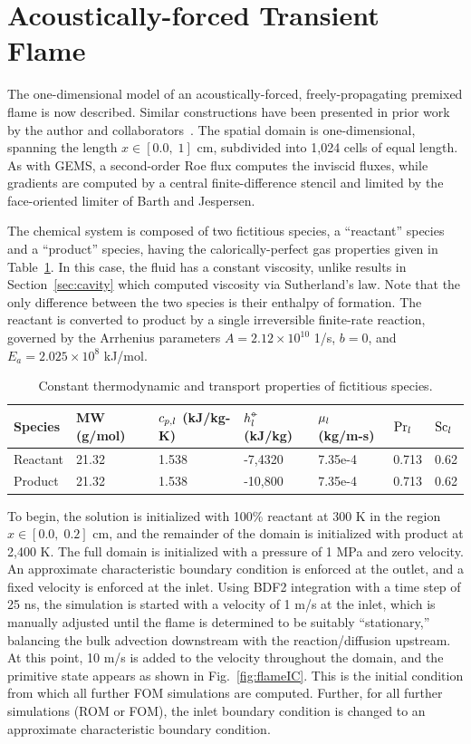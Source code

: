 \section{Acoustically-forced Transient Flame}\label{sec:oneDFlame}

The one-dimensional model of an acoustically-forced, freely-propagating premixed flame is now described. Similar constructions have been presented in prior work by the author and collaborators~\cite{Huang2022,Wentland2019}. The spatial domain is one-dimensional, spanning the length $x \in [0.0, \; 1]$ cm, subdivided into 1,024 cells of equal length. As with GEMS, a second-order Roe flux computes the inviscid fluxes, while gradients are computed by a central finite-difference stencil and limited by the face-oriented limiter of Barth and Jespersen.

The chemical system is composed of two fictitious species, a ``reactant'' species and a ``product'' species, having the calorically-perfect gas properties given in Table~\ref{tab:oneDFlameSpecs}. In this case, the fluid has a constant viscosity, unlike results in Section~\ref{sec:cavity} which computed viscosity via Sutherland's law. Note that the only difference between the two species is their enthalpy of formation. The reactant is converted to product by a single irreversible finite-rate reaction, governed by the Arrhenius parameters $A = 2.12 \times 10^{10}$ 1/s, $b = 0$, and $E_a = 2.025 \times 10^{8}$ kJ/mol.

\begin{table}
	\centering
	\begin{tabular}{ lllllll }
	\toprule
	Species & MW (g/mol) & $c_{p,l}$ (kJ/kg-K) & $h^{\circ\kern-0.47em-}_{l}$ (kJ/kg) & $\mu_{l}$ (kg/m-s) & $\text{Pr}_{l}$ & $\text{Sc}_{l}$   \\
	\midrule
	Reactant & 21.32 & 1.538 & -7,4320 & 7.35e-4 & 0.713 & 0.62 \\
	Product & 21.32 & 1.538 & -10,800 & 7.35e-4 & 0.713 & 0.62 \\
	\bottomrule
	\end{tabular}
	\caption{\label{tab:oneDFlameSpecs}Constant thermodynamic and transport properties of fictitious species.}
\end{table}

To begin, the solution is initialized with 100\% reactant at 300 K in the region $x \in [0.0, \; 0.2]$ cm, and the remainder of the domain is initialized with product at 2,400 K. The full domain is initialized with a pressure of 1 MPa and zero velocity. An approximate characteristic boundary condition is enforced at the outlet, and a fixed velocity is enforced at the inlet. Using BDF2 integration with a time step of 25 ns, the simulation is started with a velocity of 1 m/s at the inlet, which is manually adjusted until the flame is determined to be suitably ``stationary,'' balancing the bulk advection downstream with the reaction/diffusion upstream. At this point, 10 m/s is added to the velocity throughout the domain, and the primitive state appears as shown in Fig.~\ref{fig:flameIC}. This is the initial condition from which all further FOM simulations are computed. Further, for all further simulations (ROM or FOM), the inlet boundary condition is changed to an approximate characteristic boundary condition.

